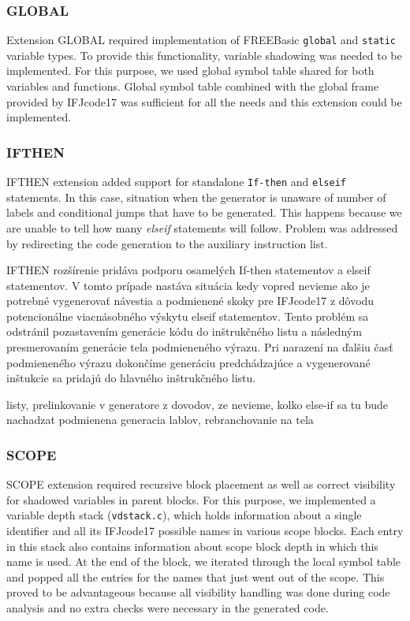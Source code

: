 \documentclass[a4paper, 11pt]{article}
\begin{document}
\subsubsection{GLOBAL}

Extension GLOBAL required implementation of FREEBasic \texttt{global} and \texttt{static} variable types. To provide this functionality, variable shadowing was needed to be implemented. For this purpose, we used global symbol table shared for both variables and functions. Global symbol table combined with the global frame provided by IFJcode17 was sufficient for all the needs and this extension could be implemented.

\subsubsection{IFTHEN}

IFTHEN extension added support for standalone \texttt{If-then} and \texttt{elseif} statements. In this case, situation when the generator is unaware of number of labels and conditional jumps that have to be generated. This happens because we are unable to tell how many \emph{elseif} statements will follow. Problem was addressed by redirecting the code generation to the auxiliary instruction list.

IFTHEN rozšírenie pridáva podporu osamelých If-then statementov a elseif statementov.
V tomto prípade nastáva situácia kedy vopred nevieme ako je potrebné vygenerovať návestia
a podmienené skoky pre IFJcode17 z dôvodu potencionálne viacnásobného výskytu elseif statementov.
Tento problém sa odstránil pozastavením generácie kódu do inštrukčného listu 
a následným presmerovaním generácie tela podmieneného výrazu. Pri narazení na ďalšiu časť
podmieneného výrazu dokončíme generáciu predchádzajúce a vygenerované inštukcie sa pridajú
do hlavného inštrukčného listu.

listy, prelinkovanie v generatore z dovodov, ze nevieme, kolko else-if sa tu bude nachadzat
podmienena generacia lablov, rebranchovanie na tela

\subsubsection{SCOPE}

SCOPE extension required recursive block placement as well as correct visibility for shadowed variables in parent blocks. For this purpose, we implemented a variable depth stack (\texttt{vdstack.c}), which holds information about a single identifier and all its IFJcode17 possible names in various scope blocks. Each entry in this stack also contains information about scope block depth in which this name is used. At the end of the block, we iterated through the local symbol table and popped all the entries for the names that just went out of the scope.  This proved to be advantageous because all visibility handling was done during code analysis and no extra checks were necessary in the generated code.
\end{document}
